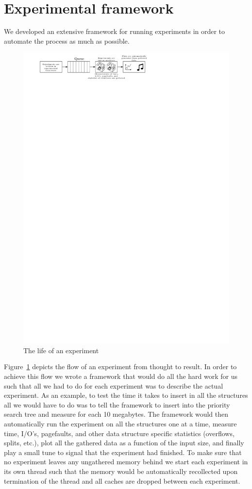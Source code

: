 \documentclass[twoside,11pt,openright]{report}
\begin{document}
\section{Experimental framework}
We developed an extensive framework for running experiments in order to automate the process as much as possible.
\begin{figure}[h]
	\centering
	\includegraphics[width=\textwidth]{../figures/experimental-setup2}
	\caption{The life of an experiment}
	\label{fig:experimental_setup2}
\end{figure}

Figure~\ref{fig:experimental_setup2} depicts the flow of an experiment from thought to result. In order to achieve this flow we wrote a framework that would do all the hard work for us such that all we had to do for each experiment was to describe the actual experiment. As an example, to test the time it takes to insert in all the structures all we would have to do was to tell the framework to insert into the priority search tree and measure for each 10 megabytes. The framework would then automatically run the experiment on all the structures one at a time, measure time, I/O's, pagefaults, and other data structure specific statistics (overflows, splits, etc.), plot all the gathered data as a function of the input size, and finally play a small tune to signal that the experiment had finished. To make sure that no experiment leaves any ungathered memory behind we start each experiment in its own thread such that the memory would be automatically recollected upon termination of the thread and all caches are dropped between each experiment.
\end{document}
